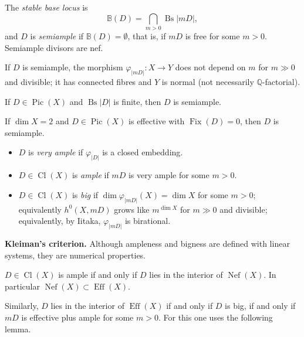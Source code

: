 The \emph{stable base locus} is
$$
\mathbb{B}(D)=\bigcap_{m>0}
\operatorname{Bs}|mD|,
$$
and $D$ is \emph{semiample} if
$\mathbb{B}(D)=\emptyset$, that is, if $mD$
is free for some $m>0$. Semiample divisors
are nef.

\begin{theorem}
\label{theorem-tevelev-semiample-fibration}
If $D$ is semiample, the morphism
$\varphi_{|mD|}\colon X\to Y$ does not
depend on $m$ for $m\gg 0$ and divisible; it
has connected fibres and $Y$ is normal (not
necessarily $\mathbb{Q}$-factorial).
\end{theorem}

\begin{theorem}[Zariski]
\label{theorem-tevelev-zariski}
If $D\in\operatorname{Pic}(X)$ and
$\operatorname{Bs}|D|$ is finite, then $D$
is semiample.
\end{theorem}

\begin{corollary}
\label{corollary-tevelev-surfaces}
If $\dim X=2$ and $D\in\operatorname{Pic}(X)$
is effective with $\operatorname{Fix}(D)=0$,
then $D$ is semiample.
\end{corollary}

\begin{itemize}
\item $D$ is \emph{very ample} if
$\varphi_{|D|}$ is a closed embedding.
\item $D\in\operatorname{Cl}(X)$ is
\emph{ample} if $mD$ is very ample for some
$m>0$.
\item $D\in\operatorname{Cl}(X)$ is
\emph{big} if
$\dim\varphi_{|mD|}(X)=\dim X$ for some
$m>0$; equivalently $h^0(X,mD)$ grows like
$m^{\dim X}$ for $m\gg 0$ and divisible;
equivalently, by Iitaka, $\varphi_{|mD|}$ is
birational.
\end{itemize}

\medskip\noindent
{\bf Kleiman's criterion.} Although
ampleness and bigness are defined with
linear systems, they are numerical
properties.

\begin{theorem}[Kleiman]
\label{theorem-tevelev-kleiman}
$D\in\operatorname{Cl}(X)$ is ample if and
only if $D$ lies in the interior of
$\operatorname{Nef}(X)$. In particular
$\operatorname{Nef}(X)\subset
\operatorname{Eff}(X)$.
\end{theorem}

Similarly, $D$ lies in the interior of
$\operatorname{Eff}(X)$ if and only if $D$
is big, if and only if $mD$ is effective
plus ample for some $m>0$. For this one uses
the following lemma.

